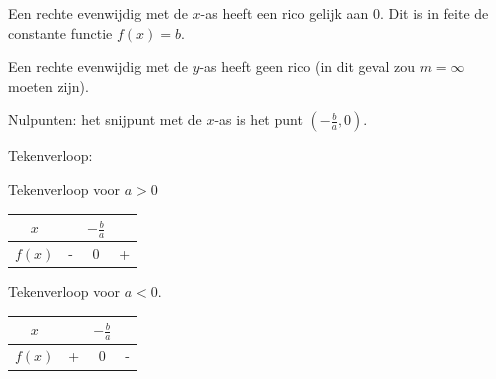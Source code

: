 
Een rechte evenwijdig met de $x$-as heeft een rico gelijk
aan 0. Dit is in feite de constante functie $f(x)=b$.

Een rechte evenwijdig met de $y$-as heeft geen rico (in
dit geval zou $m=\infty$ moeten zijn). 

Nulpunten: het snijpunt met de $x$-as is het
punt $(-\frac{b}{a},0)$.

%

Tekenverloop: 
\begin{tabel}{Tekenverloop voor $a>0$}
	\centering\begin{tabular}{c||c|c|c}
		$x$ &  & $-\frac{b}{a}$ & \\
		\hline 
		$f(x)$ & - & 0 & +\\
	\end{tabular}
\end{tabel}

\begin{tabel}{Tekenverloop voor $a<0$.}
	\centering\begin{tabular}{c||c|c|c}
		$x$ &  & $-\frac{b}{a}$ & \\
		\hline 
		$f(x)$ & + & 0 & -\\
	\end{tabular}
	\label{tab:eerst_akl0}
\end{tabel}

